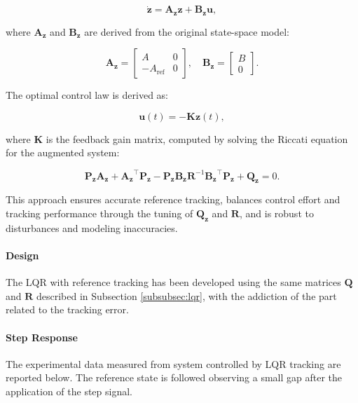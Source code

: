 \begin{equation}
    \mathbf{\dot{z}} = \mathbf{A_z} \mathbf{z} + \mathbf{B_z} \mathbf{u},
\end{equation}

where $\mathbf{A_z}$ and $\mathbf{B_z}$ are derived from the original state-space model:

\begin{equation}
    \mathbf{A_z} = \begin{bmatrix} A & 0 \\ -A_{\text{ref}} & 0 \end{bmatrix}, \quad
    \mathbf{B_z} = \begin{bmatrix} B \\ 0 \end{bmatrix}.
\end{equation}

The optimal control law is derived as:

\begin{equation}
    \mathbf{u}(t) = -\mathbf{K} \mathbf{z}(t),
\end{equation}

where $\mathbf{K}$ is the feedback gain matrix, computed by solving the Riccati equation for the augmented system:

\begin{equation}
    \mathbf{P_z} \mathbf{A_z} + \mathbf{A_z}^\top \mathbf{P_z} - \mathbf{P_z} \mathbf{B_z} \mathbf{R}^{-1} \mathbf{B_z}^\top \mathbf{P_z} + \mathbf{Q_z} = 0.
\end{equation}

This approach ensures accurate reference tracking, balances control effort and tracking performance through the tuning of $\mathbf{Q_z}$ and $\mathbf{R}$, and is robust to disturbances and modeling inaccuracies.

\paragraph{Design} The LQR with reference tracking has been developed using the same matrices $\mathbf{Q}$ and $\mathbf{R}$ described in Subsection \ref{subsubsec:lqr}, with the addiction of the part related to the tracking error.

\paragraph{Step Response} The experimental data measured from system controlled by LQR tracking are reported below. The reference state is followed observing a small gap after the application of the step signal.

